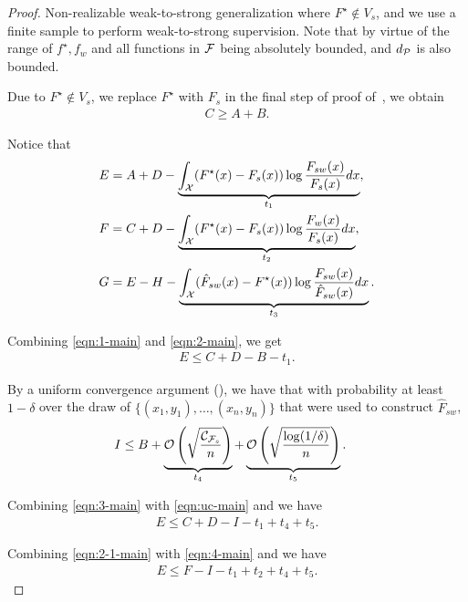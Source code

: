\begin{proof}
Non-realizable weak-to-strong generalization where $F^\star \notin V_s$, and we use a finite sample to perform weak-to-strong supervision. 
Note that by virtue of the range of $f^\star, f_w$ and all functions in $\mathcal{F}$ being absolutely bounded, and $d_\mathcal{P}$ is also bounded.



Due to $F^\star \notin V_s$, we replace $F^\star$ with $F_s$ in the final step of proof of~, we obtain
\begin{align}
    C \ge A + B. \label{eqn:1-main}
\end{align}


Notice that
\begin{align}
    & E = A + D - \underbrace{\int_{\mathcal{X}} (F^\star(x)-F_s(x))\log \frac{F_{sw}(x)}{F_s(x)} d x}_{t_1}, \label{eqn:2-main}\\ 
    & F = C + D - \underbrace{\int_{\mathcal{X}} (F^\star(x)-F_s(x))\log \frac{F_w(x)}{F_s(x)} d x}_{t_2}, \label{eqn:2-1-main} \\
    & G = E - H - \underbrace{\int_{\mathcal{X}} (\hat{F}_{sw}(x)-F^\star(x))\log \frac{F_{sw}(x)}{\hat{F}_{sw}(x)} d x}_{t_3} \label{eqn:2-2-main}. 
\end{align}

Combining \eqref{eqn:1-main} and \eqref{eqn:2-main}, we get
\begin{align}
    E \le C + D - B - t_1. \label{eqn:3-main}
\end{align}

By a uniform convergence argument (), we have that with probability at least $1-\delta$ over the draw of $\{(x_1,y_1),\dots, (x_n,y_n)\}$ that were used to construct $\hat{F}_{sw}$,
\begin{align}
    I &\le B + \underbrace{\mathcal{O}\left(\sqrt{\frac{\mathcal{C}_{\mathcal{F}_s}}{n}}\right)}_{t_4} + \underbrace{\mathcal{O}\left(\sqrt{\frac{\log(1/\delta)}{n}}\right)}_{t_5}. \label{eqn:uc-main}
\end{align}

Combining \eqref{eqn:3-main} with \eqref{eqn:uc-main} and we have
\begin{align}
    E \le C + D - I - t_1 + t_4 + t_5. \label{eqn:4-main}
\end{align}

Combining \eqref{eqn:2-1-main} with \eqref{eqn:4-main} and we have
\begin{align}
    E \le F - I - t_1 + t_2 + t_4 + t_5. \label{eqn:5-1-main}
\end{align}


\end{proof}
